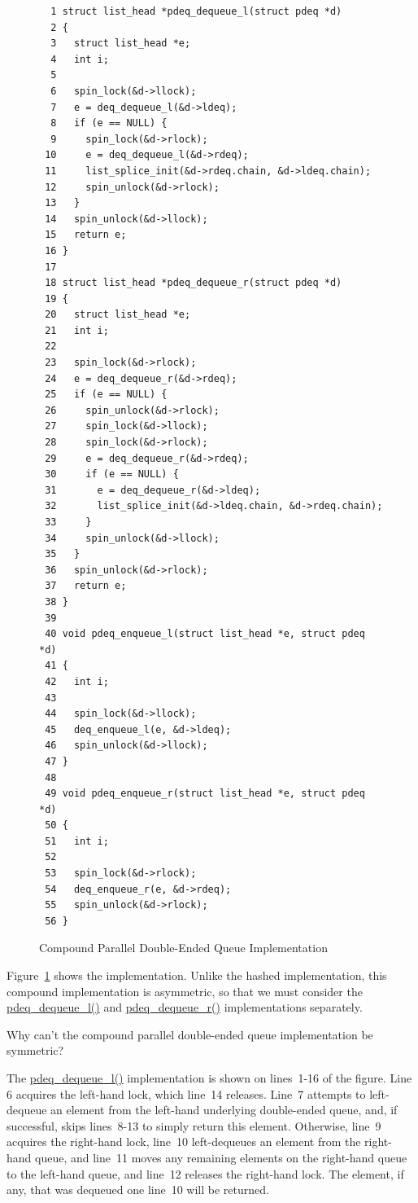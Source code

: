 \begin{figure}[bp]
{ \scriptsize
\begin{verbatim}
  1 struct list_head *pdeq_dequeue_l(struct pdeq *d)
  2 {
  3   struct list_head *e;
  4   int i;
  5 
  6   spin_lock(&d->llock);
  7   e = deq_dequeue_l(&d->ldeq);
  8   if (e == NULL) {
  9     spin_lock(&d->rlock);
 10     e = deq_dequeue_l(&d->rdeq);
 11     list_splice_init(&d->rdeq.chain, &d->ldeq.chain);
 12     spin_unlock(&d->rlock);
 13   }
 14   spin_unlock(&d->llock);
 15   return e;
 16 }
 17 
 18 struct list_head *pdeq_dequeue_r(struct pdeq *d)
 19 {
 20   struct list_head *e;
 21   int i;
 22 
 23   spin_lock(&d->rlock);
 24   e = deq_dequeue_r(&d->rdeq);
 25   if (e == NULL) {
 26     spin_unlock(&d->rlock);
 27     spin_lock(&d->llock);
 28     spin_lock(&d->rlock);
 29     e = deq_dequeue_r(&d->rdeq);
 30     if (e == NULL) {
 31       e = deq_dequeue_r(&d->ldeq);
 32       list_splice_init(&d->ldeq.chain, &d->rdeq.chain);
 33     }
 34     spin_unlock(&d->llock);
 35   }
 36   spin_unlock(&d->rlock);
 37   return e;
 38 }
 39 
 40 void pdeq_enqueue_l(struct list_head *e, struct pdeq *d)
 41 {
 42   int i;
 43 
 44   spin_lock(&d->llock);
 45   deq_enqueue_l(e, &d->ldeq);
 46   spin_unlock(&d->llock);
 47 }
 48 
 49 void pdeq_enqueue_r(struct list_head *e, struct pdeq *d)
 50 {
 51   int i;
 52 
 53   spin_lock(&d->rlock);
 54   deq_enqueue_r(e, &d->rdeq);
 55   spin_unlock(&d->rlock);
 56 }
\end{verbatim}
}
\caption{Compound Parallel Double-Ended Queue Implementation}
\label{fig:SMPdesign:Compound Parallel Double-Ended Queue Implementation}
\end{figure}

Figure~\ref{fig:SMPdesign:Compound Parallel Double-Ended Queue Implementation}
shows the implementation.
Unlike the hashed implementation, this compound implementation is
asymmetric, so that we must consider the \url{pdeq_dequeue_l()}
and \url{pdeq_dequeue_r()} implementations separately.

\QuickQuiz{}
	Why can't the compound parallel double-ended queue
	implementation be symmetric?
 \QuickQuizEnd

The \url{pdeq_dequeue_l()} implementation is shown on lines~1-16
of the figure.
Line 6 acquires the left-hand lock, which line~14 releases.
Line~7 attempts to left-dequeue an element from the left-hand underlying
double-ended queue, and, if successful, skips lines~8-13 to simply
return this element.
Otherwise, line~9 acquires the right-hand lock, line~10
left-dequeues an element from the right-hand queue,
and line~11 moves any remaining elements on the right-hand
queue to the left-hand queue, and line~12 releases the right-hand
lock.
The element, if any, that was dequeued one line~10 will be returned.

